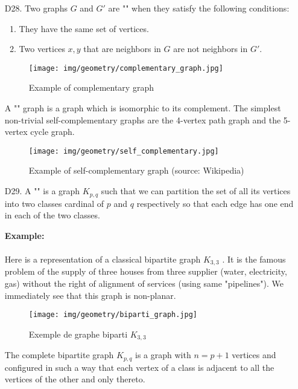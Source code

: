 {\begin{enumerate}
	\item[D28.] Two graphs $G$ and $G'$ are "" when they satisfy the following conditions:
	\begin{enumerate}
		\item They have the same set of vertices.
	
		\item Two vertices $x, y$ that are neighbors in $G$ are not neighbors in $G'$.
	\end{enumerate}
	\begin{figure}[H]
		\centering
		\texttt{[image: img/geometry/complementary\_graph.jpg]}
		\caption{Example of complementary graph}
	\end{figure}
	A "" graph is a graph which is isomorphic to its complement. The simplest non-trivial self-complementary graphs are the 4-vertex path graph and the 5-vertex cycle graph.
	\begin{figure}[H]
		\centering
		\texttt{[image: img/geometry/self\_complementary.jpg]}
		\caption{Example of self-complementary graph (source: Wikipedia)}
	\end{figure}
	
	\item[D29.] A "" is a graph $K_{p,q}$ such that we can partition the set of all its vertices into two classes cardinal of $p$ and $q$ respectively so that each edge has one end in each of the two classes.
		\begin{tcolorbox}[colframe=black,colback=white,sharp corners]
		\textbf{{\Large {}}Example:}\\\\
		Here is a representation of a classical bipartite graph $K_{3,3}$ . It is the famous problem of the supply of three houses from three supplier (water, electricity, gas) without the right of alignment of services (using same "pipelines"). We immediately see that this graph is non-planar.
		\begin{figure}[H]
			\centering
			\texttt{[image: img/geometry/biparti\_graph.jpg]}
			\caption{Exemple de graphe biparti $K_{3,3}$}
		\end{figure}
		\end{tcolorbox}
		\begin{tcolorbox}[title=Remark,colframe=black,arc=10pt]
		The complete bipartite graph $K_{p,q}$ is a graph with $n=p+1$ vertices and configured in such a way that each vertex of a class is adjacent to all the vertices of the other and only thereto.
		\end{tcolorbox}	
		

\end{enumerate}}
